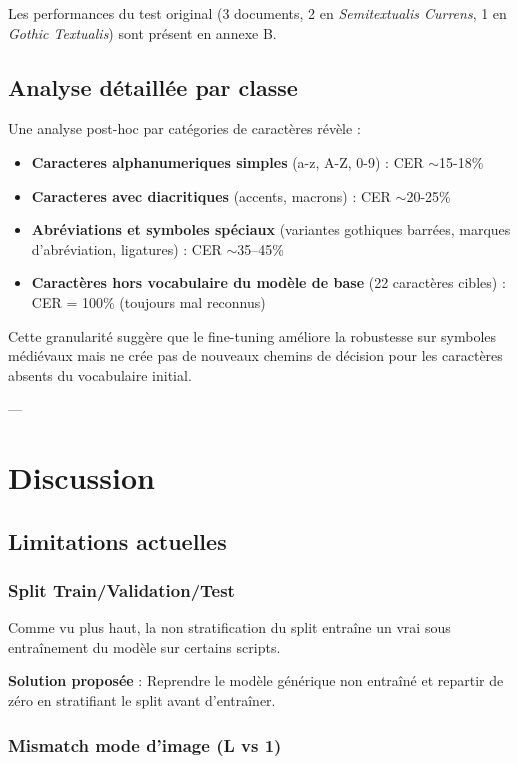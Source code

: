 ﻿\documentclass[twoside,twocolumn,10pt]{article}
\begin{document}
Les performances du test original (3 documents, 2 en \textit{Semitextualis Currens}, 1 en \textit{Gothic Textualis}) sont présent en annexe B.

\subsection{Analyse détaillée par classe}

Une analyse post-hoc par catégories de caractères révèle :

\begin{itemize}
  \item \textbf{Caracteres alphanumeriques simples} (a-z, A-Z, 0-9) : CER $\sim$15-18\%
  \item \textbf{Caracteres avec diacritiques} (accents, macrons) : CER $\sim$20-25\%
  \item \textbf{Abréviations et symboles spéciaux} (variantes gothiques barrées, marques d'abréviation, ligatures) : CER $\sim$35--45\%
  \item \textbf{Caractères hors vocabulaire du modèle de base} (22 caractères cibles) : CER = 100\% (toujours mal reconnus)
\end{itemize}

Cette granularité suggère que le fine-tuning améliore la robustesse sur symboles médiévaux mais ne crée pas de nouveaux chemins de décision pour les caractères absents du vocabulaire initial.

---

\section{Discussion}
\fontsize{11}{13}\selectfont
\justifying

\subsection{Limitations actuelles}

\subsubsection{Split Train/Validation/Test}
Comme vu plus haut, la non stratification du split entraîne un vrai sous entraînement du modèle sur certains scripts. 

\textbf{Solution proposée} : Reprendre le modèle générique non entraîné et repartir de zéro en stratifiant le split avant d'entraîner.

\subsubsection{Mismatch mode d'image (L vs 1)}
\end{document}
